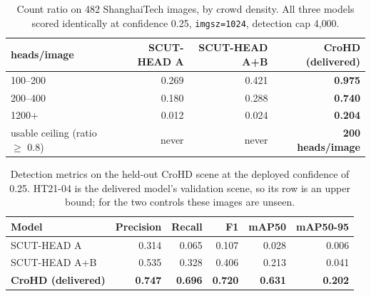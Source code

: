\begin{table}[t]
  \centering
  \caption{Count ratio on 482 ShanghaiTech images, by crowd density. All three
           models scored identically at confidence 0.25, \texttt{imgsz=1024},
           detection cap 4{,}000.}
  \label{tab:count-ratio}
  \begin{tabular}{@{}lrrr@{}}
    \toprule
    \textbf{heads/image} & \textbf{SCUT-HEAD A} & \textbf{SCUT-HEAD A+B}
      & \textbf{CroHD (delivered)} \\
    \midrule
    100--200  & 0.269 & 0.421 & \textbf{0.975} \\
    200--400  & 0.180 & 0.288 & \textbf{0.740} \\
    1200+     & 0.012 & 0.024 & \textbf{0.204} \\
    \midrule
    usable ceiling (ratio $\geq$ 0.8) & never & never
      & \textbf{200 heads/image} \\
    \bottomrule
  \end{tabular}
\end{table}


\begin{table}[t]
  \centering
  \caption{Detection metrics on the held-out CroHD scene at the deployed
           confidence of 0.25. HT21-04 is the delivered model's validation
           scene, so its row is an upper bound; for the two controls these
           images are unseen.}
  \label{tab:detection-metrics}
  \begin{tabular}{@{}lrrrrr@{}}
    \toprule
    \textbf{Model} & \textbf{Precision} & \textbf{Recall} & \textbf{F1}
      & \textbf{mAP50} & \textbf{mAP50-95} \\
    \midrule
    SCUT-HEAD A    & 0.314 & 0.065 & 0.107 & 0.028 & 0.006 \\
    SCUT-HEAD A+B  & 0.535 & 0.328 & 0.406 & 0.213 & 0.041 \\
    \textbf{CroHD (delivered)}
      & \textbf{0.747} & \textbf{0.696} & \textbf{0.720}
      & \textbf{0.631} & \textbf{0.202} \\
    \bottomrule
  \end{tabular}
\end{table}


